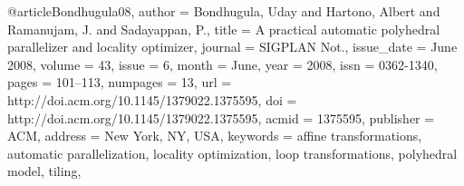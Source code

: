 @article{Bondhugula08,
 author = {Bondhugula, Uday and Hartono, Albert and Ramanujam, J. and Sadayappan, P.},
 title = {A practical automatic polyhedral parallelizer and locality optimizer},
 journal = {SIGPLAN Not.},
 issue_date = {June 2008},
 volume = {43},
 issue = {6},
 month = {June},
 year = {2008},
 issn = {0362-1340},
 pages = {101--113},
 numpages = {13},
 url = {http://doi.acm.org/10.1145/1379022.1375595},
 doi = {http://doi.acm.org/10.1145/1379022.1375595},
 acmid = {1375595},
 publisher = {ACM},
 address = {New York, NY, USA},
 keywords = {affine transformations, automatic parallelization, locality optimization, loop transformations, polyhedral model, tiling},
}

